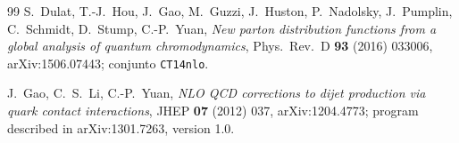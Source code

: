 \documentclass[11pt,a4paper]{article}
\begin{document}
\begin{thebibliography}{99}
 S.~Dulat, T.-J.~Hou, J.~Gao, M.~Guzzi, J.~Huston, P.~Nadolsky, J.~Pumplin, C.~Schmidt, D.~Stump, C.-P.~Yuan, \emph{New parton distribution functions from a global analysis of quantum chromodynamics}, Phys.\ Rev.\ D \textbf{93} (2016) 033006, arXiv:1506.07443; conjunto \texttt{CT14nlo}.

 J.~Gao, C.~S.~Li, C.-P.~Yuan, \emph{NLO QCD corrections to dijet production via quark contact interactions}, JHEP \textbf{07} (2012) 037, arXiv:1204.4773; program described in arXiv:1301.7263, version 1.0.

\end{thebibliography}
\end{document}

